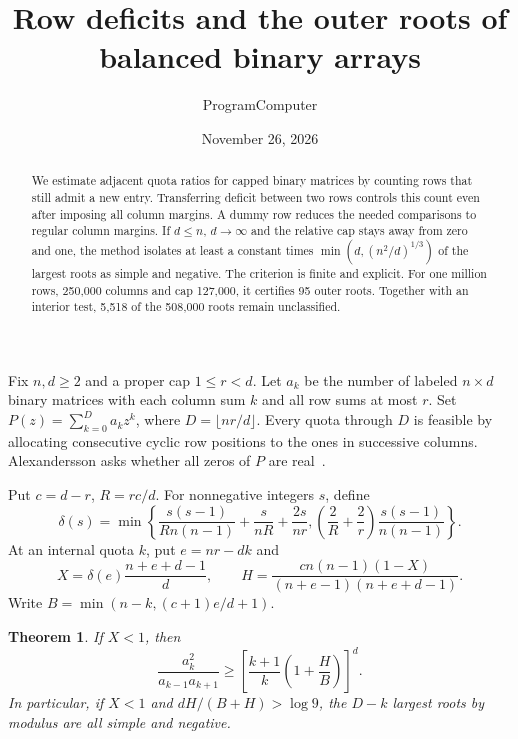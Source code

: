 \documentclass[11pt]{article}
\title{Row deficits and the outer roots of balanced binary arrays}
\author{ProgramComputer}
\date{November 26, 2026}
\newtheorem{theorem}{Theorem}
\begin{document}
\maketitle
\begin{abstract}
We estimate adjacent quota ratios for capped binary matrices by counting rows that still admit a new entry. Transferring deficit between two rows controls this count even after imposing all column margins. A dummy row reduces the needed comparisons to regular column margins. If $d\le n$, $d\to\infty$ and the relative cap stays away from zero and one, the method isolates at least a constant times $\min(d,(n^2/d)^{1/3})$ of the largest roots as simple and negative. The criterion is finite and explicit. For one million rows, 250,000 columns and cap 127,000, it certifies 95 outer roots. Together with an interior test, 5,518 of the 508,000 roots remain unclassified.
\end{abstract}

Fix $n,d\ge2$ and a proper cap $1\le r<d$. Let $a_k$ be the number of labeled $n\times d$ binary matrices with each column sum $k$ and all row sums at most $r$. Set $P(z)=\sum_{k=0}^D a_kz^k$, where $D=\lfloor nr/d\rfloor$. Every quota through $D$ is feasible by allocating consecutive cyclic row positions to the ones in successive columns. Alexandersson asks whether all zeros of $P$ are real~\cite{original}.

Put $c=d-r$, $R=rc/d$. For nonnegative integers $s$, define
\begin{equation}\label{delta}
 \delta(s)=\min\left\{\frac{s(s-1)}{R n(n-1)}+\frac{s}{nR}+\frac{2s}{nr}, \left(\frac2R+\frac2r\right)\frac{s(s-1)}{n(n-1)}\right\}.
\end{equation}
At an internal quota $k$, put $e=nr-dk$ and
\[
 X=\delta(e)\frac{n+e+d-1}{d},\qquad
 H=\frac{c n(n-1)(1-X)}{(n+e-1)(n+e+d-1)} .
\]
Write $B=\min(n-k,(c+1)e/d+1)$.

\begin{theorem}\label{edge}
If $X<1$, then
\[
 \frac{a_k^2}{a_{k-1}a_{k+1}}\ge
 \left[\frac{k+1}{k}\left(1+\frac{H}{B}\right)\right]^d .
\]
In particular, if $X<1$ and $dH/(B+H)>\log 9$, the $D-k$ largest roots by modulus are all simple and negative.
\end{theorem}
\end{document}
